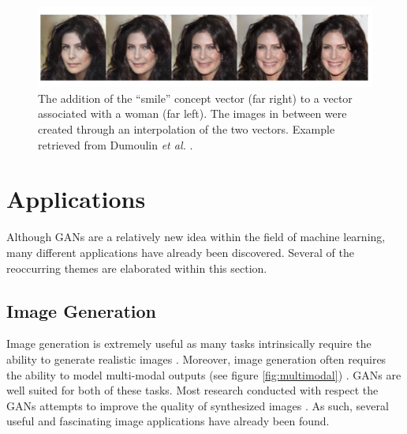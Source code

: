 \documentclass[11pt]{article}
\begin{document}
\begin{figure}
\centering
\includegraphics[scale=0.40]{smile_concept_vector}
\caption{The addition of the ``smile'' concept vector (far right) to a vector associated with a woman (far left). The images in between were created through an interpolation of the two vectors. Example retrieved from Dumoulin \textit{et al.} \citep{2016arXiv160600704D}.}
\label{fig:conceptvector}
\end{figure}



\section{Applications} \label{sec:applications}
Although GANs are a relatively new idea within the field of machine learning, many different applications have already been discovered. Several of the reoccurring themes are elaborated within this section.

\subsection{Image Generation} \label{sec:img2img}
Image generation is extremely useful as many tasks intrinsically require the ability to generate realistic images \citep{2017arXiv170100160G}. Moreover, image generation often requires the ability to model multi-modal outputs (see figure \ref{fig:multimodal}) \citep{2017arXiv170100160G}. GANs are well suited for both of these tasks. Most research conducted with respect the GANs attempts to improve the quality of synthesized images \citep{2017arXiv171007035C}. As such, several useful and fascinating image applications have already been found.
\end{document}
